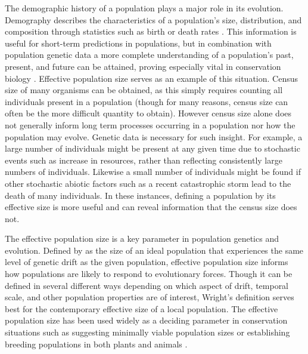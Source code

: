 The demographic history of a population plays a major role in its evolution. Demography describes the characteristics of a population's size, distribution, and composition through statistics such as birth or death rates \citep{Pavlik:2000}. This information is useful for short-term predictions in populations, but in combination with population genetic data a more complete understanding of a population's past, present, and future can be attained, proving especially vital in conservation biology \citep{Lande:1988, Avise:1995, Nunney:1993}. Effective population size serves as an example of this situation. Census size of many organisms can be obtained, as this simply requires counting all individuals present in a population (though for many reasons, census size can often be the more difficult quantity to obtain). However census size alone does not generally inform long term processes occurring in a population nor how the population may evolve. Genetic data is necessary for such insight. For example, a large number of individuals might be present at any given time due to stochastic events such as increase in resources, rather than reflecting consistently large numbers of individuals. Likewise a small number of individuals might be found if other stochastic abiotic factors such as a recent catastrophic storm lead to the death of many individuals. In these instances, defining a population by its effective size is more useful and can reveal information that the census size does not. 

The effective population size is a key parameter in population genetics and evolution. Defined by \citet{Wright:1931} as the size of an ideal population that experiences the same level of genetic drift as the given population, effective population size informs how populations are likely to respond to evolutionary forces. Though it can be defined in several different ways depending on which aspect of drift, temporal scale, and other population properties are of interest, Wright's definition serves best for the contemporary effective size of a local population. The effective population size has been used widely as a deciding parameter in conservation situations such as suggesting minimally viable population sizes or establishing breeding populations in both plants and animals \citep{Lande:1987, Soule:1987, Ellstrand:1993}.

